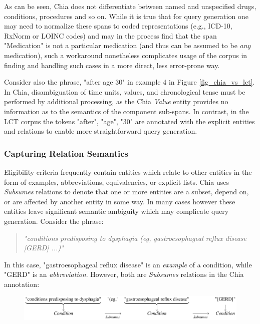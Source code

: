 \documentclass[../main.tex]{subfiles}
\begin{document}
As can be seen, Chia does not differentiate between named and unspecified drugs, conditions, procedures and so on. While it is true that for query generation one may need to normalize these spans to coded representations (e.g., ICD-10, RxNorm or LOINC codes) and may in the process find that the span "Medication" is not a particular medication (and thus can be assumed to be \textit{any} medication), such a workaround nonetheless complicates usage of the corpus in finding and handling such cases in a more direct, less error-prone way. 

Consider also the phrase, "after age 30" in example 4 in Figure \ref{fig_chia_vs_lct}. In Chia, disambiguation of time units, values, and chronological tense must be performed by additional processing, as the Chia \textit{Value} entity provides no information as to the semantics of the component sub-spans. In contrast, in the LCT corpus the tokens "after", "age", "30" are annotated with the explicit entities and relations to enable more straightforward query generation.

\subsubsection{Capturing Relation Semantics}
Eligibility criteria frequently contain entities which relate to other entities in the form of examples, abbreviations, equivalencies, or explicit lists. Chia uses \textit{Subsumes} relations to denote that one or more entities are a subset, depend on, or are affected by another entity in some way. In many cases however these entities leave significant semantic ambiguity which may complicate query generation. Consider the phrase:

\begin{quote} 
\centering 
\textit{"conditions predisposing to dysphagia (eg, gastroesophageal reflux disease [GERD] ...)"}
\end{quote} 

In this case, "gastroesophageal reflux disease" is an \textit{example} of a condition, while "GERD" is an \textit{abbreviation}. However, both are \textit{Subsumes} relations in the Chia annotation:

\begin{figure}[H]
  \includegraphics[scale=0.48]{Figures/3_lct_corpus/lct_latex_fig1.png} 
\label{fig_lct_latex1}
\end{figure}
\end{document}
